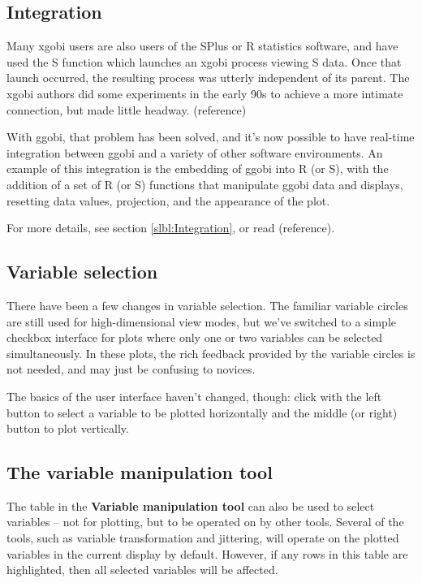\documentclass[11pt]{article}
\begin{document}
\subsection{Integration}

Many xgobi users are also users of the SPlus or R statistics
software, and have used the S function which launches an xgobi
process viewing S data.  Once that launch occurred, the resulting
process was utterly independent of its parent.  The xgobi authors
did some experiments in the early 90s to achieve a more intimate
connection, but made little headway.  (reference)

With ggobi, that problem has been solved, and it's now possible
to have real-time integration between ggobi and a variety of
other software environments.  An example of this integration is
the embedding of ggobi into R (or S), with the addition of a set of
R (or S) functions that manipulate ggobi data and displays,
resetting data values, projection, and the appearance of the plot.

For more details, see section \ref{slbl:Integration}, or read
(reference).

\subsection {Variable selection}

There have been a few changes in variable selection.  The
familiar variable circles are still used for high-dimensional
view modes, but we've switched to a simple checkbox interface
for plots where only one or two variables can be selected
simultaneously.  In these plots, the rich feedback provided
by the variable circles is not needed, and may just be confusing
to novices.

The basics of the user interface haven't changed, though:
click with the left button to select a variable to be plotted
horizontally and the middle (or right) button to plot vertically.

\subsection {The variable manipulation tool}

The table in the {\bf Variable manipulation tool} can also be used to
select variables -- not for plotting, but to be operated on by other
tools.  Several of the tools, such as variable transformation and
jittering, will operate on the plotted variables in the current
display by default.  However, if any rows in this table are
highlighted, then all selected variables will be affected.
\end{document}
